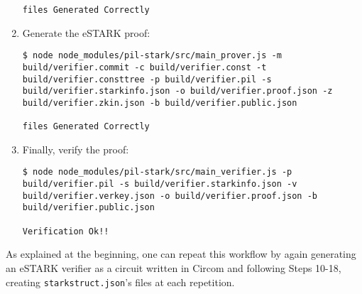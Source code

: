 \begin{enumerate}
\begin{lstlisting}[style=termt]
files Generated Correctly
\end{lstlisting}

\item Generate the eSTARK proof:
\begin{lstlisting}[style=termt]
$ node node_modules/pil-stark/src/main_prover.js -m build/verifier.commit -c build/verifier.const -t build/verifier.consttree -p build/verifier.pil -s build/verifier.starkinfo.json -o build/verifier.proof.json -z build/verifier.zkin.json -b build/verifier.public.json

files Generated Correctly
\end{lstlisting}

\item Finally, verify the proof:
\begin{lstlisting}[style=termt]
$ node node_modules/pil-stark/src/main_verifier.js -p build/verifier.pil -s build/verifier.starkinfo.json -v build/verifier.verkey.json -o build/verifier.proof.json -b build/verifier.public.json

Verification Ok!!
\end{lstlisting}
\end{enumerate}

As explained at the beginning, one can repeat this workflow by again generating an eSTARK verifier as a circuit written in Circom and following Steps 10-18, creating \texttt{starkstruct.json}'s files at each repetition.